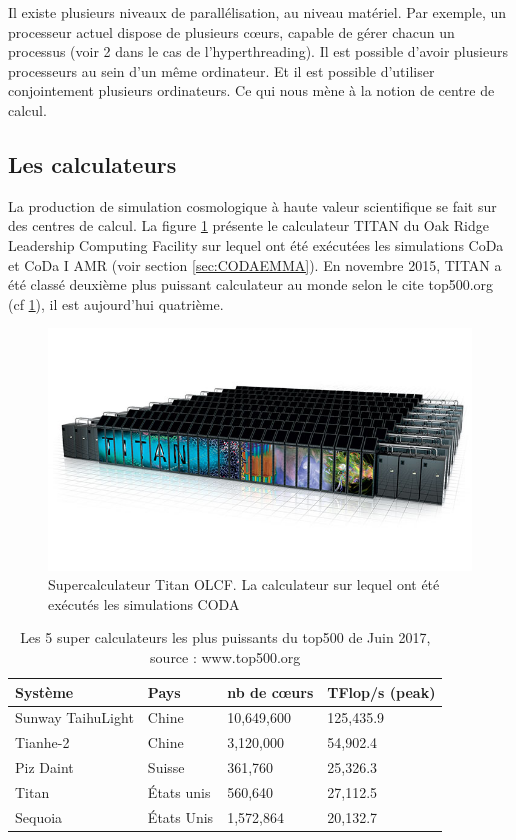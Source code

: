 Il existe plusieurs niveaux de parallélisation, au niveau matériel.
Par exemple, un processeur actuel dispose de plusieurs cœurs, capable de gérer chacun un processus (voir 2 dans le cas de l'hyperthreading).
Il est possible d'avoir plusieurs processeurs au sein d'un même ordinateur.
Et il est possible d'utiliser conjointement plusieurs ordinateurs.
Ce qui nous mène à la notion de centre de calcul.

\subsection{Les calculateurs}
\label{sec:titan}
La production de simulation cosmologique à haute valeur scientifique se fait sur des centres de calcul.
La figure \ref{fig:titan} présente le calculateur TITAN du Oak Ridge Leadership Computing Facility sur lequel ont été exécutées les simulations CoDa \citep{ocvirk_cosmic_2015} et CoDa I AMR (voir section \ref{sec:CODAEMMA}).
En novembre 2015, TITAN a été classé deuxième plus puissant calculateur au monde selon le cite top500.org (cf \ref{tab:top500}), il est aujourd'hui quatrième.

\begin{figure}
        \includegraphics[width=.95\linewidth]{img/02/titan.jpg} 
        \caption[Titan]{Supercalculateur Titan OLCF.
        La calculateur sur lequel ont été exécutés les simulations CODA}
 		\label{fig:titan}
\end{figure}

\begin{table}
\begin{tabular}{ l l l l }
\hline 
Système & Pays & nb de cœurs & TFlop/s (peak) \\
\hline 
Sunway TaihuLight & Chine & 10,649,600 & 125,435.9 \\ 
Tianhe-2  & Chine & 3,120,000 & 54,902.4 \\ 
Piz Daint  & Suisse & 361,760 & 25,326.3 \\ 
Titan  & États unis & 560,640 & 27,112.5 \\ 
Sequoia  & États Unis &1,572,864 & 20,132.7 \\ 
\end{tabular} 
\caption[TOP500]{Les 5 super calculateurs les plus puissants du top500 de Juin 2017, source : www.top500.org}
\label{tab:top500}
\end{table}


